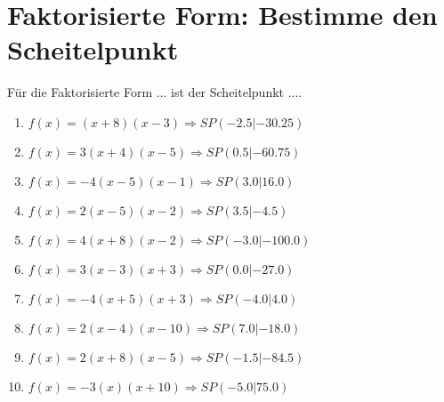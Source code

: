 \documentclass{article}%
\begin{document}
\section{Faktorisierte Form: Bestimme den Scheitelpunkt}%
\label{sec:FaktorisierteFormBestimmedenScheitelpunkt}%
Für die Faktorisierte Form ... ist der Scheitelpunkt ....%
\begin{enumerate}[label=\alph*)]%
\item%
\newline\vspace{0.5cm}$f(x)=(x+8)(x-3) \Rightarrow SP(-2.5|-30.25) $%
\item%
\newline\vspace{0.5cm}$f(x)=3(x+4)(x-5) \Rightarrow SP(0.5|-60.75) $%
\item%
\newline\vspace{0.5cm}$f(x)=-4(x-5)(x-1) \Rightarrow SP(3.0|16.0) $%
\item%
\newline\vspace{0.5cm}$f(x)=2(x-5)(x-2) \Rightarrow SP(3.5|-4.5) $%
\item%
\newline\vspace{0.5cm}$f(x)=4(x+8)(x-2) \Rightarrow SP(-3.0|-100.0) $%
\item%
\newline\vspace{0.5cm}$f(x)=3(x-3)(x+3) \Rightarrow SP(0.0|-27.0) $%
\item%
\newline\vspace{0.5cm}$f(x)=-4(x+5)(x+3) \Rightarrow SP(-4.0|4.0) $%
\item%
\newline\vspace{0.5cm}$f(x)=2(x-4)(x-10) \Rightarrow SP(7.0|-18.0) $%
\item%
\newline\vspace{0.5cm}$f(x)=2(x+8)(x-5) \Rightarrow SP(-1.5|-84.5) $%
\item%
\newline\vspace{0.5cm}$f(x)=-3(x)(x+10) \Rightarrow SP(-5.0|75.0) $%
\end{enumerate}

%
\end{document}
